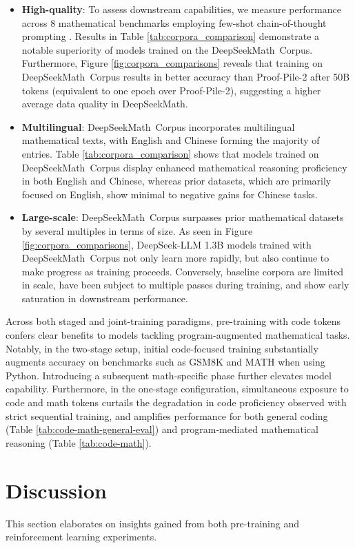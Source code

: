 \begin{itemize}[topsep=0pt]
    \item \textbf{High-quality}: 
    To assess downstream capabilities, we measure performance across 8 mathematical benchmarks employing few-shot chain-of-thought prompting \cite{cot}. Results in Table \ref{tab:corpora_comparison} demonstrate a notable superiority of models trained on the DeepSeekMath~Corpus. Furthermore, Figure \ref{fig:corpora_comparisons} reveals that training on DeepSeekMath~Corpus results in better accuracy than Proof-Pile-2 after 50B tokens (equivalent to one epoch over Proof-Pile-2), suggesting a higher average data quality in DeepSeekMath.
    \item \textbf{Multilingual}:
    DeepSeekMath~Corpus incorporates multilingual mathematical texts, with English and Chinese forming the majority of entries. Table \ref{tab:corpora_comparison} shows that models trained on DeepSeekMath~Corpus display enhanced mathematical reasoning proficiency in both English and Chinese, whereas prior datasets, which are primarily focused on English, show minimal to negative gains for Chinese tasks.
    \item \textbf{Large-scale}: 
    DeepSeekMath~Corpus surpasses prior mathematical datasets by several multiples in terms of size. As seen in Figure \ref{fig:corpora_comparisons}, DeepSeek-LLM 1.3B models trained with DeepSeekMath~Corpus not only learn more rapidly, but also continue to make progress as training proceeds. Conversely, baseline corpora are limited in scale, have been subject to multiple passes during training, and show early saturation in downstream performance.
\end{itemize}

Across both staged and joint-training paradigms, pre-training with code tokens confers clear benefits to models tackling program-augmented mathematical tasks. Notably, in the two-stage setup, initial code-focused training substantially augments accuracy on benchmarks such as GSM8K and MATH when using Python. Introducing a subsequent math-specific phase further elevates model capability. Furthermore, in the one-stage configuration, simultaneous exposure to code and math tokens curtails the degradation in code proficiency observed with strict sequential training, and amplifies performance for both general coding (Table \ref{tab:code-math-general-eval}) and program-mediated mathematical reasoning (Table \ref{tab:code-math}).

\section{Discussion}
This section elaborates on insights gained from both pre-training and reinforcement learning experiments.

